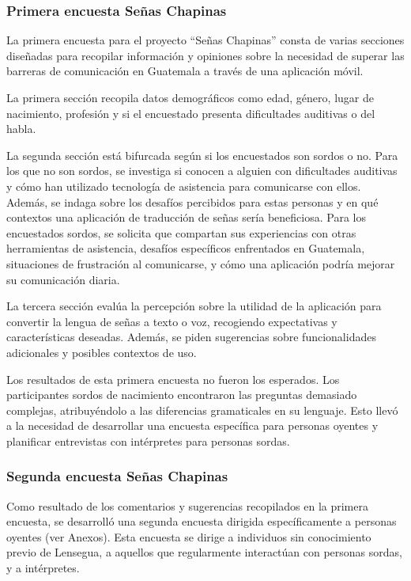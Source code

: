 \subsubsection{Primera encuesta Señas Chapinas}

La primera encuesta para el proyecto ``Señas Chapinas'' consta de varias secciones diseñadas para recopilar información y opiniones sobre la necesidad de superar las barreras de comunicación en Guatemala a través de una aplicación móvil.

La primera sección recopila datos demográficos como edad, género, lugar de nacimiento, profesión y si el encuestado presenta dificultades auditivas o del habla.

La segunda sección está bifurcada según si los encuestados son sordos o no. Para los que no son sordos, se investiga si conocen a alguien con dificultades auditivas y cómo han utilizado tecnología de asistencia para comunicarse con ellos. Además, se indaga sobre los desafíos percibidos para estas personas y en qué contextos una aplicación de traducción de señas sería beneficiosa. Para los encuestados sordos, se solicita que compartan sus experiencias con otras herramientas de asistencia, desafíos específicos enfrentados en Guatemala, situaciones de frustración al comunicarse, y cómo una aplicación podría mejorar su comunicación diaria.

La tercera sección evalúa la percepción sobre la utilidad de la aplicación para convertir la lengua de señas a texto o voz, recogiendo expectativas y características deseadas. Además, se piden sugerencias sobre funcionalidades adicionales y posibles contextos de uso.

Los resultados de esta primera encuesta no fueron los esperados. Los participantes sordos de nacimiento encontraron las preguntas demasiado complejas, atribuyéndolo a las diferencias gramaticales en su lenguaje. Esto llevó a la necesidad de desarrollar una encuesta específica para personas oyentes y planificar entrevistas con intérpretes para personas sordas.


\subsubsection{Segunda encuesta Señas Chapinas}

Como resultado de los comentarios y sugerencias recopilados en la primera encuesta, se desarrolló una segunda encuesta dirigida específicamente a personas oyentes (ver Anexos). Esta encuesta se dirige a individuos sin conocimiento previo de Lensegua, a aquellos que regularmente interactúan con personas sordas, y a intérpretes. 

